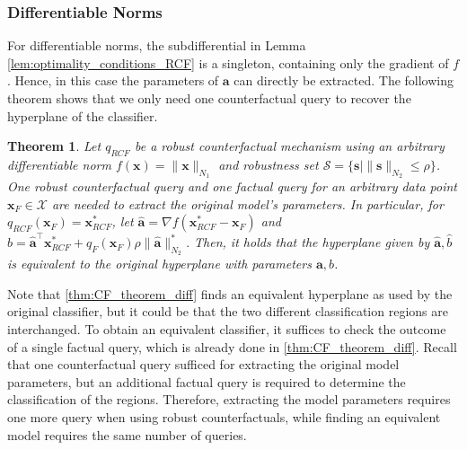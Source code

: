 \documentclass{article}
\newtheorem{theorem}{Theorem}
\begin{document}
\subsubsection{Differentiable Norms}
For differentiable norms, the subdifferential in Lemma \ref{lem:optimality_conditions_RCF} is a singleton, containing only the gradient of $f$. Hence, in this case the parameters of $\bm{a}$ can directly be extracted. The following theorem shows that we only need one counterfactual query to recover the hyperplane of the classifier.
\begin{theorem}\label{thm:RCF_diff}
Let $q_{RCF}$ be a robust counterfactual mechanism using an arbitrary differentiable norm $f(\bm{x}) = \| \bm{x} \|_{N_1}$ and robustness set $\mathcal S=\{ \bm{s}\mid \| \bm{s}\|_{N_2} \le \rho\}$. One robust counterfactual query and one factual query for an arbitrary data point $\bm{x}_F\in \mathcal X$ are needed to extract the original model's parameters. In particular, for $q_{RCF}(\bm{x}_F)=\bm{x}_{RCF}^*$, let $\hat{\bm{a}} = \nabla f(\bm{x}_{RCF}^*-\bm{x}_F)$ and $\hat b = \hat{\bm{a}}^\top \bm{x}_{RCF}^* +q_F(\bm{x}_F)\rho\| \hat{\bm{a}}\|_{N_2}^*$. Then, it holds that the hyperplane given by $\hat{\bm{a}},\hat{b}$ is equivalent to the original hyperplane with parameters $\bm{a},b$.
\end{theorem}
Note that \cref{thm:CF_theorem_diff} finds an equivalent hyperplane as used by the original classifier, but it could be that the two different classification regions are interchanged. To obtain an equivalent classifier, it suffices to check the outcome of a single factual query, which is already done in \cref{thm:CF_theorem_diff}. Recall that one counterfactual query sufficed for extracting the original model parameters, but an additional factual query is required to determine the classification of the regions. Therefore, extracting the model parameters requires one more query when using robust counterfactuals, while finding an equivalent model requires the same number of queries.
\end{document}
